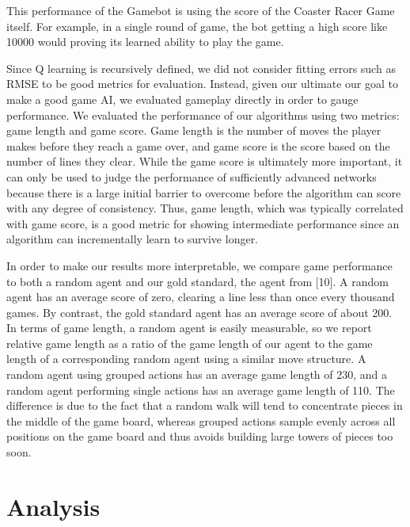 \documentclass[a4paper]{article}
\begin{document}
This performance of the Gamebot is using the score of the Coaster Racer Game itself. For example, in a single round of game, the bot getting a high score like 10000 would proving its learned ability to play the game.

Since Q learning is recursively defined, we did not consider fitting errors such as RMSE to be good metrics for evaluation. Instead, given our ultimate our goal to make a good game AI, we evaluated gameplay directly in order to gauge performance. We evaluated the performance of our algorithms using two metrics: game length and game score. Game length is the number of moves the player makes before they reach a game over, and game score is the score based on the number of lines they clear. While the game score is ultimately more important, it can only be used to judge the performance of sufficiently advanced networks because there is a large initial barrier to overcome before the algorithm can score with any degree of consistency. Thus, game length, which was typically correlated with game score, is a good metric for showing intermediate performance since an algorithm can incrementally learn to survive longer.

In order to make our results more interpretable, we compare game performance to both a random agent and our gold standard, the agent from [10]. A random agent has an average score of zero, clearing a line less than once every thousand games. By contrast, the gold standard agent has an average score of about 200. In terms of game length, a random agent is easily measurable, so we report relative game length as a ratio of the game length of our agent to the game length of a corresponding random agent using a similar move structure. A random agent using grouped actions has an average game length of 230, and a random agent performing single actions has an average game length of 110. The difference is due to the fact that a random walk will tend to concentrate pieces in the middle of the game board, whereas grouped actions sample evenly across all positions on the game board and thus avoids building large towers of pieces too soon.
        


\section{Analysis}
\end{document}
